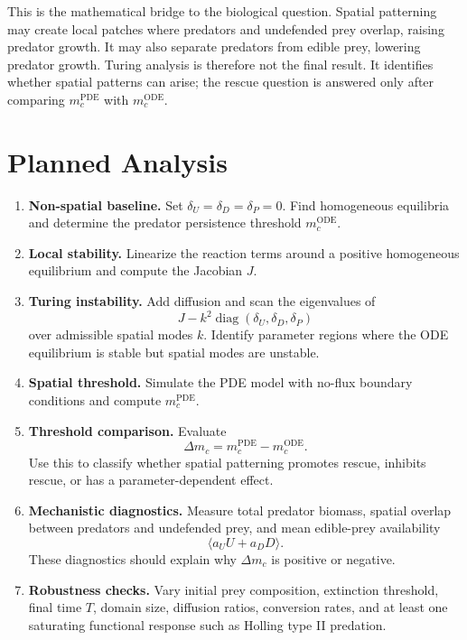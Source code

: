 \documentclass[12pt,letterpaper]{article}
\numberwithin{equation}{section}
\begin{document}
This is the mathematical bridge to the biological question. Spatial patterning may
create local patches where predators and undefended prey overlap, raising predator
growth. It may also separate predators from edible prey, lowering predator growth.
Turing analysis is therefore not the final result. It identifies whether spatial
patterns can arise; the rescue question is answered only after comparing
$m_c^{\mathrm{PDE}}$ with $m_c^{\mathrm{ODE}}$.

\section{Planned Analysis}

\begin{enumerate}[leftmargin=2.2em]
    \item \textbf{Non-spatial baseline.} Set
    $\delta_U=\delta_D=\delta_P=0$. Find homogeneous equilibria and determine the
    predator persistence threshold $m_c^{\mathrm{ODE}}$.

    \item \textbf{Local stability.} Linearize the reaction terms around a positive
    homogeneous equilibrium and compute the Jacobian $J$.

    \item \textbf{Turing instability.} Add diffusion and scan the eigenvalues of
    \begin{equation}
        J-k^2\operatorname{diag}(\delta_U,\delta_D,\delta_P)
    \end{equation}
    over admissible spatial modes $k$. Identify parameter regions where the ODE
    equilibrium is stable but spatial modes are unstable.

    \item \textbf{Spatial threshold.} Simulate the PDE model with no-flux boundary
    conditions and compute $m_c^{\mathrm{PDE}}$.

    \item \textbf{Threshold comparison.} Evaluate
    \begin{equation}
        \Delta m_c=m_c^{\mathrm{PDE}}-m_c^{\mathrm{ODE}}.
    \end{equation}
    Use this to classify whether spatial patterning promotes rescue, inhibits rescue,
    or has a parameter-dependent effect.

    \item \textbf{Mechanistic diagnostics.} Measure total predator biomass, spatial
    overlap between predators and undefended prey, and mean edible-prey availability
    \begin{equation}
        \langle a_UU+a_DD\rangle.
    \end{equation}
    These diagnostics should explain why $\Delta m_c$ is positive or negative.

    \item \textbf{Robustness checks.} Vary initial prey composition, extinction
    threshold, final time $T$, domain size, diffusion ratios, conversion rates, and at
    least one saturating functional response such as Holling type II predation.
\end{enumerate}
\end{document}
